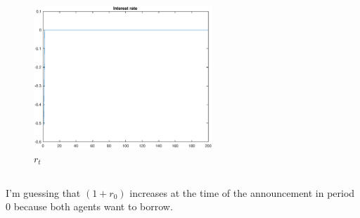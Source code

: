 \documentclass[12pt]{article}
\begin{document}
\begin{figure}[h]
    \centering
        \includegraphics[width=0.6\textwidth]{IRF_r.eps}
        \caption{$r_t$}
\end{figure}
 
\subsection{} I'm guessing that $(1+r_0)$ increases at the time of the announcement in period 0 because both agents want to borrow.
\end{document}
